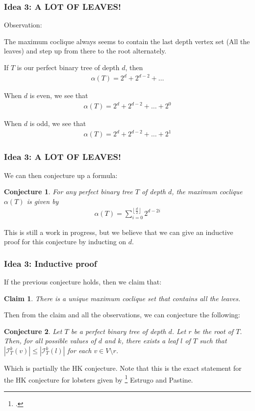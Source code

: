\documentclass[10pt,]{beamer}
\theoremstyle{conjectureStyle}
\newtheorem*{conjecture}{Conjecture}
\theoremstyle{notationStyle}
\theoremstyle{claimStyle}
\newtheorem*{claim}{Claim}
\begin{document}
\begin{frame}\frametitle{Idea 3: A LOT OF LEAVES!}
    Observation:

    The maximum coclique always seems to contain the last depth vertex set (All the leaves) and step up from there to the root alternately.

    If $T$ is our perfect binary tree of depth $d$, then
    \begin{align*}
        \alpha(T) = 2^d + 2^{d-2} + \ldots
    \end{align*}

    When $d$ is even, we see that
    \begin{align*}
        \alpha(T) = 2^d + 2^{d-2} + \ldots + 2^0
    \end{align*}

    When $d$ is odd, we see that
    \begin{align*}
        \alpha(T) = 2^d + 2^{d-2} + \ldots + 2^1
    \end{align*}
\end{frame}

\begin{frame}\frametitle{Idea 3: A LOT OF LEAVES!}
    We can then conjecture up a formula:

    \begin{conjecture}
        For any perfect binary tree $T$ of depth $d$, the maximum coclique $\alpha(T)$ is given by
        \begin{align*}
            \alpha(T) = \sum_{i= 0}^{\left\lfloor\frac{d}{2}\right\rfloor} 2^{d - 2i}
        \end{align*}
    \end{conjecture}

    This is still a work in progress, but we believe that we can give an inductive proof for this conjecture by inducting on $d$.
\end{frame}

\begin{frame}\frametitle{Idea 3: Inductive proof}
    If the previous conjecture holds, then we claim that:

    \begin{claim}
        There is a unique maximum coclique set that contains all the leaves.
    \end{claim}

    Then from the claim and all the observations, we can conjecture the following:

    \begin{conjecture}
        Let $T$ be a perfect binary tree of depth $d$. Let $r$ be the root of $T$. Then, for all possible values of $d$ and $k$, there exists a leaf $l$ of $T$ such that $|\mathcal{I}^k_T(v)| \leq |\mathcal{I}^k_T(l)|$ for each $v \in V\setminus{r}$.
    \end{conjecture}

    Which is partially the HK conjecture. Note that this is the exact statement for the HK conjecture for lobsters given by \footcite{MR4245360} Estrugo and Pastine.
\end{frame}
\end{document}
